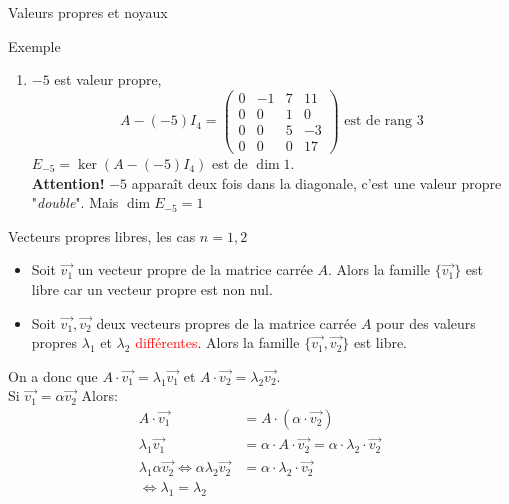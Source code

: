 \begin{parag}{Valeurs propres et noyaux}
\begin{subparag}{Exemple}
\begin{enumerate}
            \item $-5$ est valeur propre,
            \[A - (-5)I_4 = \begin{pmatrix}
            0 & -1 & 7 & 11\\
            0 & 0  &1 & 0\\
            0 & 0 & 5 & -3\\
            0 & 0 & 0 & 17
        \end{pmatrix} \text{  est de rang }3\]
        $E_{-5} = \ker (A - (-5)I_4)$ est de $\dim 1$.
        \\
        \textbf{Attention!} $-5$ apparaît deux fois dans la diagonale, c'est une valeur propre "\textit{double}". Mais $\dim E_{-5} = 1$
        \end{enumerate}
    \end{subparag}
\end{parag}
\begin{parag}{Vecteurs propres libres, les cas $n= 1, 2$}
    \begin{itemize}
        \item Soit $\vec{v_1}$ un vecteur propre de la matrice carrée $A$. Alors la famille $\{\vec{v_1}\}$ est libre car un vecteur propre est non nul.
        \item Soit $\vec{v_1}, \vec{v_2}$ deux vecteurs propres de la matrice carrée $A$ pour des valeurs propres $\lambda_1$ et $\lambda_2$ \textcolor{red}{différentes}. Alors la famille $\{\vec{v_1}, \vec{v_2}\}$ est libre.
    \end{itemize}

    On a donc que $A\cdot \vec{v_1} = \lambda_1\vec{v_1}$ et $A\cdot \vec{v_2} = \lambda_2\vec{v_2}$.
    \\
    Si $\vec{v_1} = \alpha \vec{v_2}$ Alors:
    \begin{align*}
        A\cdot\vec{v_1} &= A \cdot(\alpha \cdot \vec{v_2})\\
        \lambda_1\vec{v_1} &= \alpha \cdot A \cdot \vec{v_2} = \alpha \cdot \lambda_2 \cdot\vec{v_2}\\
        \lambda_1\alpha\vec{v_2} \Leftrightarrow \alpha\lambda_2\vec{v_2} &= \alpha \cdot\lambda_2 \cdot \vec{v_2}\\
        \Leftrightarrow \lambda_1 = \lambda_2
    \end{align*}
\end{parag}

